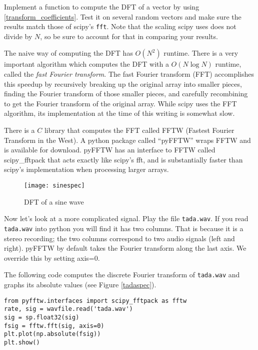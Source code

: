 \begin{problem}
Implement a function to compute the DFT of a vector by using \eqref{transform_coefficients}. %
Test it on several random vectors and make sure the results match those of scipy's \texttt{fft}.
Note that the scaling scipy uses does not divide by $N$, so be sure to account for that in comparing your results.
\end{problem}

The naive way of computing the DFT has $O(N^2)$ runtime.
There is a very important algorithm which computes the DFT with a $O(N \log N)$ runtime, called the \emph{fast Fourier transform}.
The fast Fourier transform (FFT) accomplishes this speedup by recursively breaking up the original array into smaller pieces, finding the Fourier transform of those smaller pieces, and carefully recombining to get the Fourier transform of the original array.
While scipy uses the FFT algorithm, its implementation at the time of this writing is somewhat slow.

There is a $C$ library that computes the FFT called FFTW (Fastest Fourier Transform in the West).
A python package called ``pyFFTW'' wraps FFTW and is available for download.
pyFFTW  has an interface to FFTW called scipy\_fftpack that acts exactly like scipy's fft, and is substantially faster than scipy's implementation when processing larger arrays.


\begin{figure}[ht]\caption{DFT of a sine wave}\label{sinespec}\centering\texttt{[image: sinespec]}\end{figure}

Now let's look at a more complicated signal. Play the file \texttt{tada.wav}.
If you read \texttt{tada.wav} into python you will find it has two columns.
That is because it is a stereo recording; the two columns correspond to two audio signals (left and right).
pyFFTW by default takes the Fourier transform along the last axis.  We override this by setting axis=0.

The following code computes the discrete Fourier transform of \texttt{tada.wav} and graphs its absolute values (see Figure \ref{tadaspec}).
\begin{lstlisting}
from pyfftw.interfaces import scipy_fftpack as fftw
rate, sig = wavfile.read('tada.wav')
sig = sp.float32(sig)
fsig = fftw.fft(sig, axis=0)
plt.plot(np.absolute(fsig))
plt.show()
\end{lstlisting}


